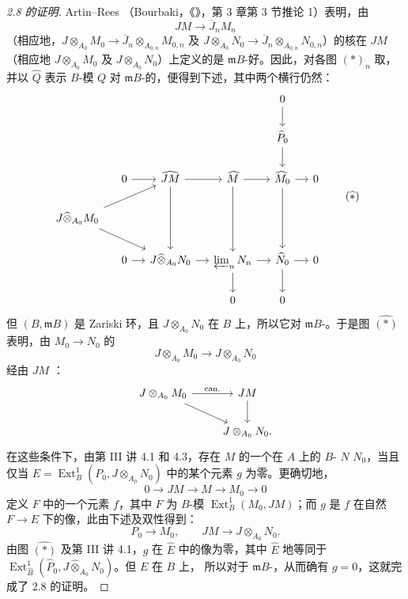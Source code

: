 \begin{proof}[2.8 的证明]
Artin--Rees （Bourbaki，《》，第 3 章第 3 节推论 1）表明，由
\[JM\longrightarrow\overline J_nM_n\]
（相应地，$J\otimes_{A_0}M_0\to\overline J_n\otimes_{A_{0,n}}M_{0,n}$ 及 $J\otimes_{A_0}N_0\to\overline J_n\otimes_{A_{0,n}}N_{0,n}$）的核在 $JM$（相应地 $J\otimes_{A_0}M_0$ 及 $J\otimes_{A_0}N_0$）上定义的是 $\mathfrak mB$-好。因此，对各图 $(*)_n$ 取，并以 $\widehat Q$ 表示 $B$-模 $Q$ 对 $\mathfrak mB$-的，便得到下述，其中两个横行仍然：
\[
\begin{tikzcd}[column sep=small]
&&&&0\arrow[d]\\
&&&&\widehat P_0\arrow[d]\\
&0\arrow[r]&\widehat{JM}\arrow[r]\arrow[dd]&\widehat M\arrow[r]\arrow[dd]&\widehat M_0\arrow[r]\arrow[dd]&0\\
J\widehat\otimes_{A_0}M_0\arrow[urr]\arrow[drr]&&&&&\\
&0\arrow[r]&J\widehat\otimes_{A_0}N_0\arrow[r]&\varprojlim_n N_n\arrow[r]\arrow[d]&\widehat N_0\arrow[r]\arrow[d]&0\\
&&&0&0
\end{tikzcd}\tag{$\widehat *$}
\]
但 $(B,\mathfrak mB)$ 是 Zariski 环，且 $J\otimes_{A_0}N_0$ 在 $B$ 上，所以它对 $\mathfrak mB$-。于是图 $\widehat{(*)}$ 表明，由 $M_0\to N_0$ 的
\[J\otimes_{A_0}M_0\longrightarrow J\otimes_{A_0}N_0\]
经由 $JM$ ：
\[
\begin{tikzcd}
J\otimes_{A_0}M_0\arrow[r,"\mathrm{can.}"]\arrow[dr]&JM\arrow[d]\\
&J\otimes_{A_0}N_0.
\end{tikzcd}
\]
在这些条件下，由第 III 讲 4.1 和 4.3，存在 $M$ 的一个在 $A$ 上的 $B$- $N$  $N_0$，当且仅当 $E=\operatorname{Ext}^1_B(P_0,J\otimes_{A_0}N_0)$ 中的某个元素 $g$ 为零。更确切地，
\[0\longrightarrow JM\longrightarrow M\longrightarrow M_0\longrightarrow0\]
定义 $F$ 中的一个元素 $f$，其中 $F$ 为 $B$-模 $\operatorname{Ext}^1_B(M_0,JM)$；而 $g$ 是 $f$ 在自然 $F\to E$ 下的像，此由下述及双性得到：
\[P_0\longrightarrow M_0,\qquad JM\longrightarrow J\otimes_{A_0}N_0.\]
由图 $\widehat{(*)}$ 及第 III 讲 4.1，$g$ 在 $\widehat E$ 中的像为零，其中 $\widehat E$ 地等同于 $\operatorname{Ext}^1_{\widehat B}(\widehat P_0,J\widehat\otimes_{A_0}N_0)$。但 $E$ 在 $B$ 上，
所以对于 $\mathfrak mB$-，从而确有 $g=0$，这就完成了 2.8 的证明。
\end{proof}
